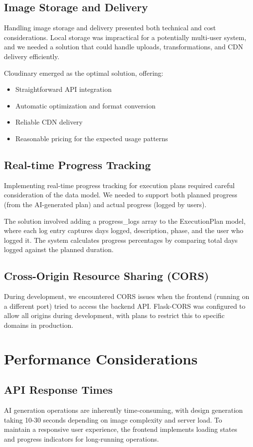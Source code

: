 \documentclass[conference]{IEEEtran}
\begin{document}
\subsection{Image Storage and Delivery}
Handling image storage and delivery presented both technical and cost considerations. Local storage was impractical for a potentially multi-user system, and we needed a solution that could handle uploads, transformations, and CDN delivery efficiently.

Cloudinary emerged as the optimal solution, offering:
\begin{itemize}
    \item Straightforward API integration
    \item Automatic optimization and format conversion
    \item Reliable CDN delivery
    \item Reasonable pricing for the expected usage patterns
\end{itemize}

\subsection{Real-time Progress Tracking}
Implementing real-time progress tracking for execution plans required careful consideration of the data model. We needed to support both planned progress (from the AI-generated plan) and actual progress (logged by users).

The solution involved adding a progress\_logs array to the ExecutionPlan model, where each log entry captures days logged, description, phase, and the user who logged it. The system calculates progress percentages by comparing total days logged against the planned duration.

\subsection{Cross-Origin Resource Sharing (CORS)}
During development, we encountered CORS issues when the frontend (running on a different port) tried to access the backend API. Flask-CORS was configured to allow all origins during development, with plans to restrict this to specific domains in production.

\section{Performance Considerations}

\subsection{API Response Times}
AI generation operations are inherently time-consuming, with design generation taking 10-30 seconds depending on image complexity and server load. To maintain a responsive user experience, the frontend implements loading states and progress indicators for long-running operations.
\end{document}
